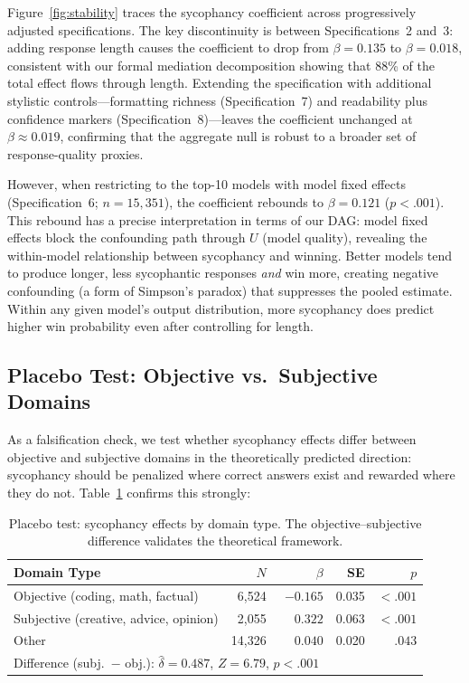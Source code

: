 \documentclass[11pt,twocolumn,a4paper]{article}
\begin{document}
Figure~\ref{fig:stability} traces the sycophancy coefficient across
progressively adjusted specifications. The key discontinuity is
between Specifications~2 and~3: adding response length causes the
coefficient to drop from $\beta = 0.135$ to $\beta = 0.018$,
consistent with our formal mediation decomposition showing that 88\%
of the total effect flows through length. Extending the specification
with additional stylistic controls---formatting richness
(Specification~7) and readability plus confidence markers
(Specification~8)---leaves the coefficient unchanged at
$\beta \approx 0.019$, confirming that the aggregate null is robust
to a broader set of response-quality proxies.

However, when restricting to the top-10 models with model fixed
effects (Specification~6; $n = 15{,}351$), the coefficient rebounds
to $\beta = 0.121$ ($p < .001$). This rebound has a precise
interpretation in terms of our DAG: model fixed effects block the
confounding path through $U$ (model quality), revealing the
within-model relationship between sycophancy and winning. Better
models tend to produce longer, less sycophantic responses \emph{and}
win more, creating negative confounding (a form of Simpson's paradox)
that suppresses the pooled estimate. Within any given model's output
distribution, more sycophancy does predict higher win probability
even after controlling for length.

\subsection{Placebo Test: Objective vs.\ Subjective Domains}

As a falsification check, we test whether sycophancy effects differ
between objective and subjective domains in the theoretically predicted
direction: sycophancy should be penalized where correct answers exist
and rewarded where they do not. Table~\ref{tab:placebo} confirms this
strongly:

\begin{table}[t]
  \centering
  \caption{Placebo test: sycophancy effects by domain type.
    The objective--subjective difference validates the theoretical
    framework.}
  \label{tab:placebo}
  \begin{tabular}{lrrrr}
    \toprule
    Domain Type & $N$ & $\beta$ & SE & $p$ \\
    \midrule
    Objective (coding, math, factual) & 6,524 & $-0.165$ & 0.035 & $<.001$ \\
    Subjective (creative, advice, opinion) & 2,055 & $\phantom{-}0.322$ & 0.063 & $<.001$ \\
    Other & 14,326 & $\phantom{-}0.040$ & 0.020 & $.043$ \\
    \midrule
    \multicolumn{5}{l}{Difference (subj.\ $-$ obj.): $\hat{\delta} = 0.487$,
      $Z = 6.79$, $p < .001$} \\
    \bottomrule
  \end{tabular}
\end{table}
\end{document}
